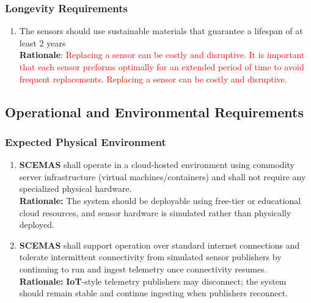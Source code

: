 \documentclass[]{article}
\begin{document}
\subsubsection{Longevity Requirements}
\label{ssub:longevity_requirements}
\begin{enumerate}[{PR-L}1. ]
	\item The sensors should use sustainable materials that guarantee a lifespan of at least 2 years\\
    \textbf{Rationale}: \textcolor{red}{Replacing a sensor can be costly and disruptive. It is important that each sensor preforms optimally for an extended period of time to avoid frequent replacements. Replacing a sensor can be costly and disruptive. {\cite{PRL1}}}
\end{enumerate}


\subsection{Operational and Environmental Requirements}
\label{sub:operational_and_environmental_requirements}

\subsubsection{Expected Physical Environment}
\label{ssub:expected_physical_environment}
\begin{enumerate}[{OE-EPE}1. ]
	\item \textbf{SCEMAS} shall operate in a cloud-hosted environment using commodity server infrastructure (virtual machines/containers) and shall not require any specialized physical hardware.\\
    \textbf{Rationale:} The system should be deployable using free-tier or educational cloud resources, and sensor hardware is simulated rather than physically deployed.
    
	\item \textbf{SCEMAS} shall support operation over standard internet connections and tolerate intermittent connectivity from simulated sensor publishers by continuing to run and ingest telemetry once connectivity resumes.\\
    \textbf{Rationale:} \textbf{IoT}-style telemetry publishers may disconnect; the system should remain stable and continue ingesting when publishers reconnect.
\end{enumerate}
\end{document}
